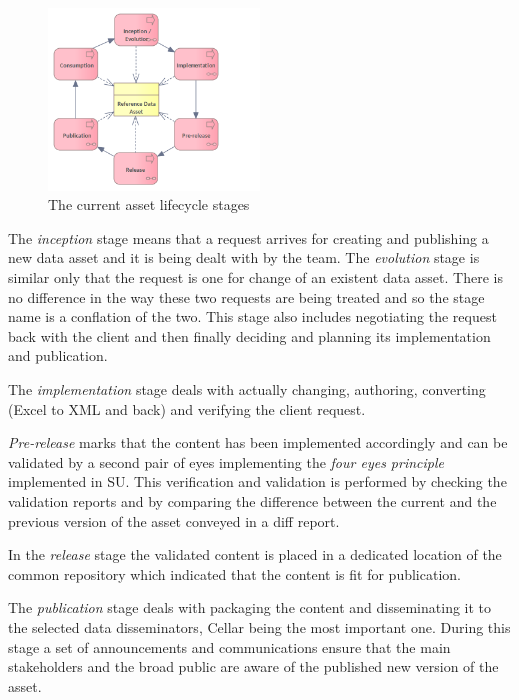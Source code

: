 	\begin{figure}[h]
		\centering
		\includegraphics[width=0.5\textwidth]{images/business/Lifecycle process only (current).png}
		\caption{The current asset lifecycle stages}
		\label{fig:lifecycle-current-stages}
	\end{figure} 

	The \textit{inception} stage means that a request arrives for creating and publishing a new data asset and it is being dealt with by the team. The \textit{evolution} stage is similar only that the request is one for change of an existent data asset. There is no difference in the way these two requests are being treated and so the stage name is a conflation of the two. This stage also includes negotiating the request back with the client and then finally deciding and planning its implementation and publication. 
	
	The \textit{implementation} stage deals with actually changing, authoring, converting (Excel to XML and back) and verifying the client request. 
	
	\textit{Pre-release} marks that the content has been implemented accordingly and can be validated by a second pair of eyes implementing the \textit{four eyes principle} implemented in SU. This verification and validation is performed by checking the validation reports and by comparing the difference between the current and the previous version of the asset conveyed in a diff report. 
	
	In the \textit{release} stage the validated content is placed in a dedicated location of the common repository which indicated that the content is fit for publication. 
	
	The \textit{publication} stage deals with packaging the content and disseminating it to the selected data disseminators, Cellar being the most important one. During this stage a set of announcements and communications ensure that the main stakeholders and the broad public are aware of the published new version of the asset. 
	
